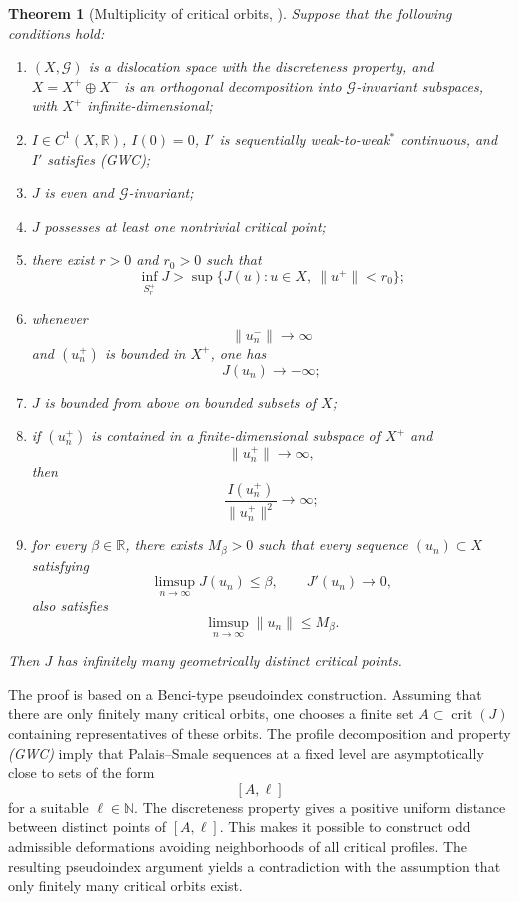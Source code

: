 \documentclass[11pt]{amsart}
\numberwithin{equation}{section}
\newtheorem{theorem}{Theorem}[section]
\theoremstyle{definition}
\newcommand{\R}{\mathbb{R}}
\newcommand{\N}{\mathbb{N}}
\newcommand{\cG}{\mathcal{G}}
\newcommand{\crit}{\operatorname{crit}}
\begin{document}
\begin{theorem}[Multiplicity of critical orbits, {\cite[Theorem 3.2]{BBS2025}}]\label{thm:multiplicity-abstract}
Suppose that the following conditions hold:
\begin{enumerate}[label=\textup{(A\arabic*)}]
\item
$(X,\cG)$ is a dislocation space with the discreteness property, and
$X=X^+\oplus X^-$ is an orthogonal decomposition into $\cG$-invariant
subspaces, with $X^+$ infinite-dimensional;

\item
$I\in C^1(X,\R)$, $I(0)=0$, $I'$ is sequentially weak-to-weak$^*$
continuous, and $I'$ satisfies (GWC);

\item
$J$ is even and $\cG$-invariant;

\item
$J$ possesses at least one nontrivial critical point;

\item
there exist $r>0$ and $r_0>0$ such that
\[
\inf_{S_r^+}J
>
\sup\{J(u):u\in X,\ \|u^+\|<r_0\};
\]

\item
whenever
\[
\|u_n^-\|\to\infty
\]
and $(u_n^+)$ is bounded in $X^+$, one has
\[
J(u_n)\to-\infty;
\]

\item
$J$ is bounded from above on bounded subsets of $X$;

\item
if $(u_n^+)$ is contained in a finite-dimensional subspace of $X^+$ and
\[
\|u_n^+\|\to\infty,
\]
then
\[
\frac{I(u_n^+)}{\|u_n^+\|^2}\to\infty;
\]

\item
for every $\beta\in\R$, there exists $M_\beta>0$ such that every sequence
$(u_n)\subset X$ satisfying
\[
\limsup_{n\to\infty}J(u_n)\leq\beta,
\qquad
J'(u_n)\to0,
\]
also satisfies
\[
\limsup_{n\to\infty}\|u_n\|\leq M_\beta.
\]
\end{enumerate}
Then $J$ has infinitely many geometrically distinct critical points.
\end{theorem}

The proof is based on a Benci-type pseudoindex construction. Assuming that
there are only finitely many critical orbits, one chooses a finite set
$A\subset\crit(J)$ containing representatives of these orbits. The profile
decomposition and property \emph{(GWC)} imply that Palais--Smale sequences
at a fixed level are asymptotically close to sets of the form
\[
[A,\ell]
\]
for a suitable $\ell\in\N$. The discreteness property gives a positive
uniform distance between distinct points of $[A,\ell]$. This makes it
possible to construct odd admissible deformations avoiding neighborhoods
of all critical profiles. The resulting pseudoindex argument yields a
contradiction with the assumption that only finitely many critical orbits
exist.
\end{document}
